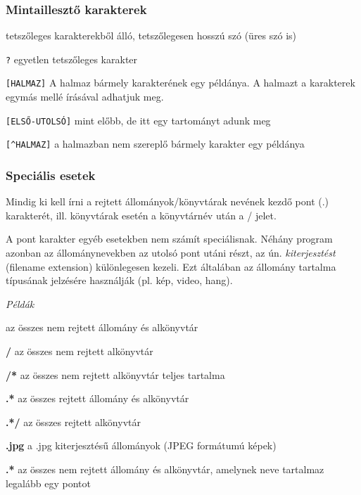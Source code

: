 \subsubsection*{Mintaillesztő karakterek}
\begin{description}
\item{\tt *} tetszőleges karakterekből álló, tetszőlegesen hosszú szó (üres szó is)
\item{\tt ?} egyetlen tetszőleges karakter
\item{\tt[HALMAZ]} A halmaz bármely karakterének egy példánya. A halmazt a karakterek egymás mellé írásával adhatjuk meg.
\item{\tt[ELSŐ-UTOLSÓ]} mint előbb, de itt egy tartományt adunk meg
\item{\tt[\verb.^.HALMAZ]} a halmazban nem szereplő bármely karakter egy példánya
\end{description}

\subsubsection*{Speciális esetek}
Mindig ki kell írni a rejtett állományok/könyvtárak nevének kezdő pont (.) karakterét, ill. könyvtárak esetén a könyvtárnév után a / jelet.

A pont karakter egyéb esetekben nem számít speciálisnak. Néhány program azonban az állománynevekben az utolsó pont utáni részt, az ún. \emph{kiterjesztést} (filename extension) különlegesen kezeli. Ezt általában az állomány tartalma típusának jelzésére használják (pl. kép, video, hang).\bigskip

\noindent\textit{Példák}
\begin{description}
\item{\bf *} az összes nem rejtett állomány és alkönyvtár
\item{\bf */} az összes nem rejtett alkönyvtár
\item{\bf */*} az összes nem rejtett alkönyvtár teljes tartalma
\item{\bf .*} az összes rejtett állomány és alkönyvtár
\item{\bf .*/} az összes rejtett alkönyvtár
\item{\bf *.jpg} a .jpg kiterjesztésű állományok (JPEG formátumú képek)
\item{\bf *.*} az összes nem rejtett állomány és alkönyvtár, amelynek neve tartalmaz legalább egy pontot
\end{description}


